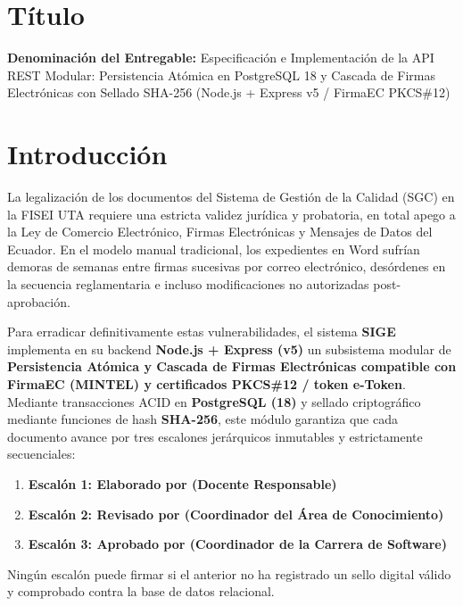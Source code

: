 \documentclass[12pt,a4paper]{article}
\begin{document}
\section{Título}
\textbf{Denominación del Entregable:} Especificación e Implementación de la API REST Modular: Persistencia Atómica en PostgreSQL 18 y Cascada de Firmas Electrónicas con Sellado SHA-256 (Node.js + Express v5 / FirmaEC PKCS\#12)



\section{Introducción}
La legalización de los documentos del Sistema de Gestión de la Calidad (SGC) en la FISEI UTA requiere una estricta validez jurídica y probatoria, en total apego a la Ley de Comercio Electrónico, Firmas Electrónicas y Mensajes de Datos del Ecuador. En el modelo manual tradicional, los expedientes en Word sufrían demoras de semanas entre firmas sucesivas por correo electrónico, desórdenes en la secuencia reglamentaria e incluso modificaciones no autorizadas post-aprobación.

Para erradicar definitivamente estas vulnerabilidades, el sistema \textbf{SIGE} implementa en su backend \textbf{Node.js + Express (v5)} un subsistema modular de \textbf{Persistencia Atómica y Cascada de Firmas Electrónicas compatible con FirmaEC (MINTEL) y certificados PKCS\#12 / token e-Token}. Mediante transacciones ACID en \textbf{PostgreSQL (18)} y sellado criptográfico mediante funciones de hash \textbf{SHA-256}, este módulo garantiza que cada documento avance por tres escalones jerárquicos inmutables y estrictamente secuenciales:
\begin{enumerate}[leftmargin=1.5em, itemsep=1.5pt]
    \item \textbf{Escalón 1: Elaborado por (Docente Responsable)}
    \item \textbf{Escalón 2: Revisado por (Coordinador del Área de Conocimiento)}
    \item \textbf{Escalón 3: Aprobado por (Coordinador de la Carrera de Software)}
\end{enumerate}

Ningún escalón puede firmar si el anterior no ha registrado un sello digital válido y comprobado contra la base de datos relacional.
\end{document}
